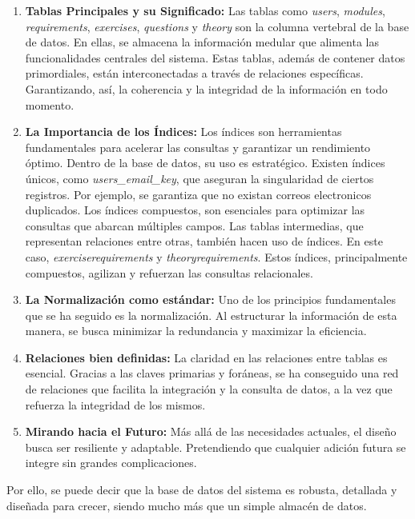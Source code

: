 \begin{enumerate}
    \item \textbf{Tablas Principales y su Significado:} Las tablas como \textit{users}, \textit{modules}, \textit{requirements}, \textit{exercises}, \textit{questions} y \textit{theory} son la columna vertebral de la base de datos. En ellas, se almacena la información medular que alimenta las funcionalidades centrales del sistema. Estas tablas, además de contener datos primordiales, están interconectadas a través de relaciones específicas. Garantizando, así, la coherencia y la integridad de la información en todo momento.
    
    \item  \textbf{La Importancia de los Índices:} Los índices son herramientas fundamentales para acelerar las consultas y garantizar un rendimiento óptimo. Dentro de la base de datos, su uso es estratégico. Existen índices únicos, como \textit{users\_email\_key}, que aseguran la singularidad de ciertos registros. Por ejemplo, se garantiza que no existan correos electronicos duplicados. Los índices compuestos, son esenciales para optimizar las consultas que abarcan múltiples campos. Las tablas intermedias, que representan relaciones entre otras, también hacen uso de índices. En este caso, \textit{exerciserequirements} y \textit{theoryrequirements}. Estos índices, principalmente compuestos, agilizan y refuerzan las consultas relacionales.

    \item \textbf{La Normalización como estándar:} Uno de los principios fundamentales que se ha seguido es la normalización. Al estructurar la información de esta manera, se busca minimizar la redundancia y maximizar la eficiencia.

    \item \textbf{Relaciones bien definidas:} La claridad en las relaciones entre tablas es esencial. Gracias a las claves primarias y foráneas, se ha conseguido una red de relaciones que facilita la integración y la consulta de datos, a la vez que refuerza la integridad de los mismos.

    \item \textbf{Mirando hacia el Futuro:} Más allá de las necesidades actuales, el diseño busca ser resiliente y adaptable. Pretendiendo que cualquier adición futura se integre sin grandes complicaciones.
\end {enumerate}

Por ello, se puede decir que la base de datos del sistema es robusta, detallada y diseñada para crecer, siendo mucho más que un simple almacén de datos.

